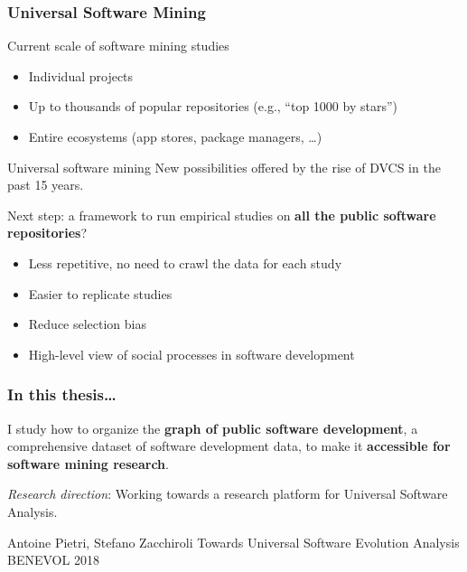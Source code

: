 \documentclass[aspectratio=169,xcolor=table]{beamer}
\begin{document}
    \begin{frame}
        \frametitle{Universal Software Mining}

        \begin{block}{Current scale of software mining studies}
            \begin{itemize}
                \item Individual projects
                \item Up to thousands of popular repositories (e.g., ``top
                    1000 by stars'')
                \item Entire ecosystems (app stores, package managers, …)
            \end{itemize}
        \end{block}

        \begin{block}{Universal software mining}
            New possibilities offered by the rise of DVCS in the past 15 years.

            Next step: a framework to run empirical studies on
            \textbf{all the public software repositories}?

            \begin{itemize}
                \item Less repetitive, no need to crawl the data for each study
                \item Easier to replicate studies
                \item Reduce selection bias
                \item High-level view of social processes in software
                    development
            \end{itemize}
        \end{block}
    \end{frame}

    \begin{frame}
        \frametitle{In this thesis…}

        \begin{block}{}
            \Large
            I study how to organize the \textbf{graph of public software
            development}, a comprehensive dataset of software development data,
            to make it \textbf{accessible for software mining research}.
        \end{block}

        \begin{block}{}
            \emph{Research direction}: Working towards a research platform for
            Universal Software Analysis.

            \footnotesize
            \begin{thebibliography}{swhbenevol}
                 Antoine Pietri, Stefano Zacchiroli\newblock
                Towards Universal Software Evolution Analysis\newblock
                BENEVOL 2018\newblock
            \end{thebibliography}
        \end{block}
    \end{frame}
\end{document}
